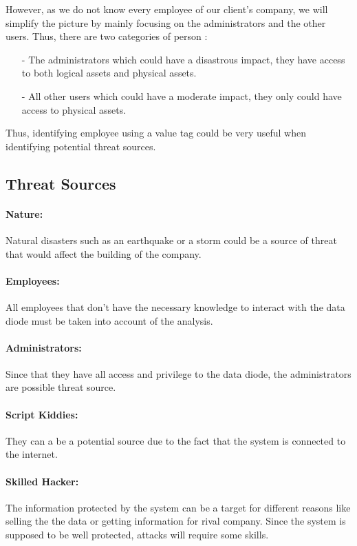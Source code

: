 \documentclass[a4paper,10pt]{article}
\begin{document}
However, as we do not know every employee of our client's company, we will simplify the picture by mainly focusing on the administrators and the other users. Thus, there are two categories of person :
\begin{enumerate}
\item[-] The administrators which could have a disastrous impact, they have access to both logical assets and physical assets.
\item[-] All other users which could have a moderate impact, they only could have access to physical assets.
\end{enumerate}
Thus, identifying employee using a value tag could be very useful when identifying potential threat sources.


\subsection{Threat Sources}

\paragraph{Nature:} Natural disasters such as an earthquake or a storm could be a source of threat that would affect the building of the company.

\paragraph{Employees:} All employees that don't have the necessary knowledge to interact with the data diode must be taken into account of the analysis.

\paragraph{Administrators:} Since that they have all access and privilege to the data diode, the administrators are possible threat source.

\paragraph{Script Kiddies:} They can a be a potential source due to the fact that the system is connected to the internet.

\paragraph{Skilled Hacker:} The information protected by the system can be a target for different reasons like selling the the data or getting information for rival company. Since the system is supposed to be well protected, attacks will require some skills.
\end{document}
